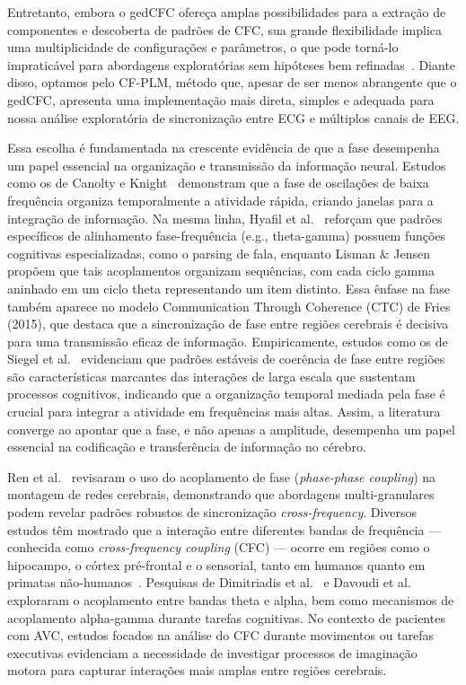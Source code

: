 Entretanto, embora o gedCFC ofereça amplas possibilidades para a extração de componentes e descoberta de padrões de CFC, sua grande flexibilidade implica uma multiplicidade de configurações e parâmetros, o que pode torná-lo impraticável para abordagens exploratórias sem hipóteses bem refinadas~\cite{cohen2017multivariate}. Diante disso, optamos pelo CF-PLM, método que, apesar de ser menos abrangente que o gedCFC, apresenta uma implementação mais direta, simples e adequada para nossa análise exploratória de sincronização entre ECG e múltiplos canais de EEG.

Essa escolha é fundamentada na crescente evidência de que a fase desempenha um papel essencial na organização e transmissão da informação neural. Estudos como os de Canolty e Knight~\cite{canolty2010functional} demonstram que a fase de oscilações de baixa frequência organiza temporalmente a atividade rápida, criando janelas para a integração de informação. Na mesma linha, Hyafil et al.~\cite{hyafil2015neural} reforçam que padrões específicos de alinhamento fase-frequência (e.g., theta-gamma) possuem funções cognitivas especializadas, como o parsing de fala, enquanto Lisman \& Jensen~\cite{lisman2013theta} propõem que tais acoplamentos organizam sequências, com cada ciclo gamma aninhado em um ciclo theta representando um item distinto. Essa ênfase na fase também aparece no modelo Communication Through Coherence (CTC) de Fries (2015), que destaca que a sincronização de fase entre regiões cerebrais é decisiva para uma transmissão eficaz de informação. Empiricamente, estudos como os de Siegel et al.~\cite{siegel2012spectral} evidenciam que padrões estáveis de coerência de fase entre regiões são características marcantes das interações de larga escala que sustentam processos cognitivos, indicando que a organização temporal mediada pela fase é crucial para integrar a atividade em frequências mais altas. Assim, a literatura converge ao apontar que a fase, e não apenas a amplitude, desempenha um papel essencial na codificação e transferência de informação no cérebro.

Ren et al.~\cite{ren2022multi} revisaram o uso do acoplamento de fase (\textit{phase-phase coupling}) na montagem de redes cerebrais, demonstrando que abordagens multi-granulares podem revelar padrões robustos de sincronização \textit{cross-frequency}. Diversos estudos têm mostrado que a interação entre diferentes bandas de frequência --- conhecida como \textit{cross-frequency coupling} (CFC) --- ocorre em regiões como o hipocampo, o córtex pré-frontal e o sensorial, tanto em humanos quanto em primatas não-humanos~\cite{mormann2005phase, canolty2006high, jensen2007cross, khamechian2020decoding}. Pesquisas de Dimitriadis et al.~\cite{dimitriadis2015cognitive} e Davoudi et al.~\cite{davoudi2021prefrontal} exploraram o acoplamento entre bandas theta e alpha, bem como mecanismos de acoplamento alpha-gamma durante tarefas cognitivas. No contexto de pacientes com AVC, estudos focados na análise do CFC durante movimentos ou tarefas executivas evidenciam a necessidade de investigar processos de imaginação motora para capturar interações mais amplas entre regiões cerebrais.

